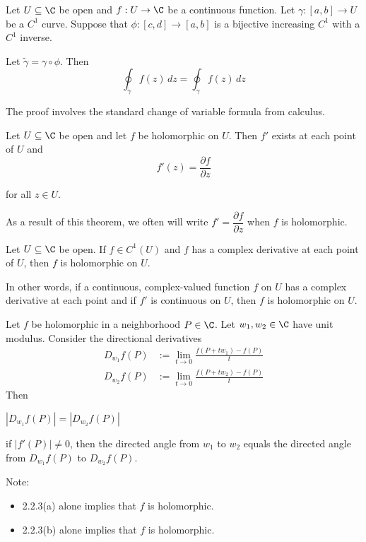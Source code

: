 Let $U\subseteq\C$ be open and $f:U\to\C$ be a continuous function. Let
$\gamma:[a,b]\to U$ be a $C^1$ curve. Suppose that $\phi:[c,d]\to[a,b]$ is a
bijective increasing $C^1$ with a $C^1$ inverse.


Let $\tilde\gamma=\gamma\circ\phi$. Then
$$\oint_{\tilde\gamma}f(z)\,dz=\oint_\gamma f(z)\,dz$$

The proof involves the standard change of variable formula from calculus.

\label{f75e43c}

Let $U\subseteq\C$ be open and let $f$ be holomorphic on $U$. Then $f'$ exists
at each point of $U$ and
$$f'(z)=\frac{\partial f}{\partial z}$$

for all $z\in U$.

As a result of this theorem, we often will write $f'=\dfrac{\partial
  f}{\partial z}$ when $f$ is holomorphic.

\label{d037b0f}

Let $U\subseteq\C$ be open. If $f\in C^1(U)$ and $f$ has a complex derivative
at each point of $U$, then $f$ is holomorphic on $U$.

In other words, if a continuous, complex-valued function $f$ on $U$ has a
complex derivative at each point and if $f'$ is continuous on $U$, then $f$ is
holomorphic on $U$.

\label{c41052e}

Let $f$ be holomorphic in a neighborhood $P\in\C$. Let $w_1,w_2\in\C$ have unit
modulus. Consider the directional derivatives
\begin{align*}
  D_{w_1}f(P) & :=\lim_{t\to0}\frac{f(P+tw_1)-f(P)}t \\
  D_{w_2}f(P) & :=\lim_{t\to0}\frac{f(P+tw_2)-f(P)}t
\end{align*}
Then
\begin{enumerata}
  \item $|D_{w_1}f(P)|=|D_{w_2}f(P)|$
  \item if $|f'(P)|\neq0$, then the directed angle from $w_1$ to $w_2$ equals the
  directed angle from $D_{w_1}f(P)$ to $D_{w_2}f(P)$.
\end{enumerata}
Note:
\begin{itemize}
  \item 2.2.3(a) alone implies that $f$ is holomorphic.
  \item 2.2.3(b) alone implies that $f$ is holomorphic.
\end{itemize}

